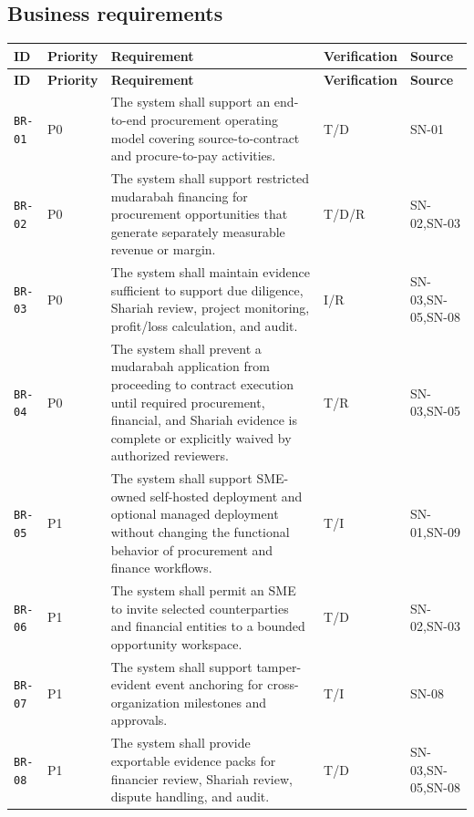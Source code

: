 \documentclass[11pt,a4paper]{article}
\begin{document}
\subsection{Business requirements}\label{sec:business-reqs}
\begin{footnotesize}
\begin{longtable}{@{}p{}p{}p{}p{}p{}@{}}
\rowcolor{gray!18}\textbf{ID} & \textbf{Priority} & \textbf{Requirement} & \textbf{Verification} & \textbf{Source} \\ \hline
\endfirsthead
\rowcolor{gray!18}\textbf{ID} & \textbf{Priority} & \textbf{Requirement} & \textbf{Verification} & \textbf{Source} \\ \hline
\endhead
\texttt{BR-01} & P0 & The system shall support an end-to-end procurement operating model covering source-to-contract and procure-to-pay activities. & T/D & SN-01 \\ \hline
\texttt{BR-02} & P0 & The system shall support restricted mudarabah financing for procurement opportunities that generate separately measurable revenue or margin. & T/D/R & SN-02,SN-03 \\ \hline
\texttt{BR-03} & P0 & The system shall maintain evidence sufficient to support due diligence, Shariah review, project monitoring, profit/loss calculation, and audit. & I/R & SN-03,SN-05,SN-08 \\ \hline
\texttt{BR-04} & P0 & The system shall prevent a mudarabah application from proceeding to contract execution until required procurement, financial, and Shariah evidence is complete or explicitly waived by authorized reviewers. & T/R & SN-03,SN-05 \\ \hline
\texttt{BR-05} & P1 & The system shall support SME-owned self-hosted deployment and optional managed deployment without changing the functional behavior of procurement and finance workflows. & T/I & SN-01,SN-09 \\ \hline
\texttt{BR-06} & P1 & The system shall permit an SME to invite selected counterparties and financial entities to a bounded opportunity workspace. & T/D & SN-02,SN-03 \\ \hline
\texttt{BR-07} & P1 & The system shall support tamper-evident event anchoring for cross-organization milestones and approvals. & T/I & SN-08 \\ \hline
\texttt{BR-08} & P1 & The system shall provide exportable evidence packs for financier review, Shariah review, dispute handling, and audit. & T/D & SN-03,SN-05,SN-08 \\ \hline

\end{longtable}
\end{footnotesize}
\end{document}

